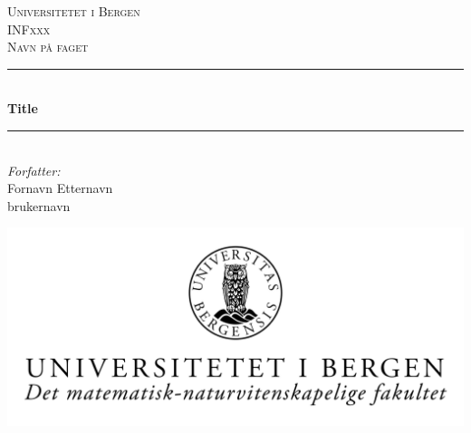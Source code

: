 \begin{titlepage}


\newcommand{\HRule}{\rule{\linewidth}{0.5mm}} %

\center %
 

\textsc{\LARGE Universitetet i Bergen}\\[1.5cm] %
\textsc{\Large INFxxx}\\[0.5cm] %
\textsc{\large Navn på faget}\\[0.5cm] %


\HRule \\[0.4cm]
{ \huge \bfseries Title}\\[0.4cm] %
\HRule \\[1.5cm]
 

\Large \emph{Forfatter:}\\
Fornavn Etternavn\\brukernavn
\\[2cm]


\centerline{\includegraphics[scale=1.5]{figures/canvasWithFaculty}}


\end{titlepage}
